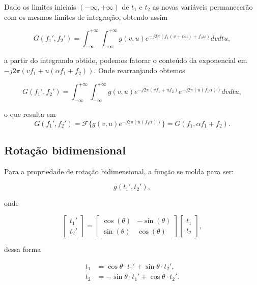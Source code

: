 Dado os limites iniciais $(-\infty,+\infty)$ de $t_1$ e $t_2$ as novas variáveis permanecerão com os mesmos limites de integração, obtendo assim


\begin{equation*}
    G(f_1',f_2') = \int_{-\infty}^{+\infty} \int_{-\infty}^{+\infty} {g(v,u)e^{-j2\pi (f_1(v +\alpha u)+f_2u)}}dvdtu,
\end{equation*}

\noindent
a partir do integrando obtido, podemos fatorar o conteúdo da exponencial em $-j2\pi(vf_1 + u(\alpha f_1 + f_2))$. Onde rearranjando obtemos

\begin{equation*}
    G(f_1',f_2') = \int_{-\infty}^{ +\infty} \int_{-\infty}^{+\infty} {g(v,u)e^{-j2\pi(vf_1 + uf_2)}e^{-j2\pi(u(f_1\alpha))}}dvdtu,
\end{equation*}

\noindent
o que resulta em
\begin{equation*}
      G(f_1',f_2') =\mathcal{F}\{g(v, u)e^{-j2\pi(u(f_1\alpha))}\}= G(f_1, \alpha f_1 + f_2).
\end{equation*}


\subsection{Rotação bidimensional}

Para a propriedade de rotação bidimensional, a função se molda para ser:

\begin{equation*}
    g(t_1',t_2'),
\end{equation*}

\noindent
onde

\[
\begin{bmatrix}
t_1' \\
t_2'
\end{bmatrix}
=
\begin{bmatrix}
\cos(\theta) & -\sin(\theta) \\
\sin(\theta) & \cos(\theta)
\end{bmatrix}
\begin{bmatrix}
t_1 \\
t_2
\end{bmatrix},
\]

\noindent
dessa forma

\begin{align}
    t_1 &= \cos\theta \cdot t_1' + \sin\theta \cdot t_2', \\
    t_2 &= -\sin\theta \cdot t_1' + \cos\theta \cdot t_2'.
\end{align}

